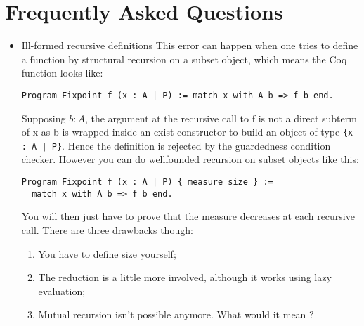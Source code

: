 \section{Frequently Asked Questions
  \label{ProgramFAQ}}

\begin{itemize}
\item {Ill-formed recursive definitions}
  This error can happen when one tries to define a
  function by structural recursion on a subset object, which means the Coq
  function looks like:
  
  \verb$Program Fixpoint f (x : A | P) := match x with A b => f b end.$
  
  Supposing $b : A$, the argument at the recursive call to f is not a
  direct subterm of x as b is wrapped inside an exist constructor to build
  an object of type \verb${x : A | P}$.  Hence the definition is rejected
  by the guardedness condition checker. However you can do
  wellfounded recursion on subset objects like this:
  
\begin{verbatim}
Program Fixpoint f (x : A | P) { measure size } :=
  match x with A b => f b end.
\end{verbatim}
  
  You will then just have to prove that the measure decreases at each recursive
  call. There are three drawbacks though: 
  \begin{enumerate}
  \item You have to define size yourself;
  \item The reduction is a little more involved, although it works
    using lazy evaluation;
  \item Mutual recursion isn't possible anymore. What would it mean ?
  \end{enumerate}
\end{itemize}

